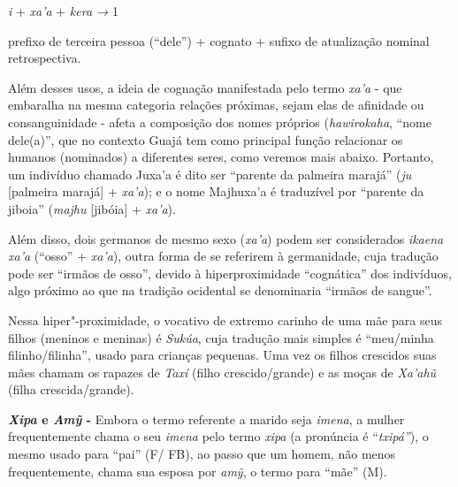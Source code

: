 \begin{center}
\emph{i} + \emph{xa'a} + \emph{kera} \emph{→} 1
\end{center}

\noindent prefixo de terceira pessoa (``dele'') + cognato + sufixo de atualização
nominal retrospectiva.

Além desses usos, a ideia de cognação manifestada pelo termo \emph{xa'a}
- que embaralha na mesma categoria relações próximas, sejam elas de
afinidade ou consanguinidade - afeta a composição dos nomes próprios
(\emph{hawirokaha}, ``nome dele(a)'', que no contexto Guajá tem como
principal função relacionar os humanos (nominados) a diferentes seres,
como veremos mais abaixo. Portanto, um indivíduo chamado Juxa'a é dito
ser ``parente da palmeira marajá'' (\emph{ju} {[}palmeira marajá{]} +
\emph{xa'a}); e o nome Majhuxa'a é traduzível por ``parente da jiboia''
(\emph{majhu} {[}jibóia{]} + \emph{xa'a}).

Além disso, dois germanos de mesmo sexo (\emph{xa'a}) podem ser
considerados \emph{ikaena} \emph{xa'a} (``osso'' + \emph{xa'a}), outra
forma de se referirem à germanidade, cuja tradução pode ser ``irmãos de
osso'', devido à hiperproximidade ``cognática'' dos indivíduos, algo
próximo ao que na tradição ocidental se denominaria ``irmãos de sangue''.

Nessa hiper"-proximidade, o vocativo de extremo carinho de uma mãe para
seus filhos (meninos e meninas) é \emph{Sukúa}, cuja tradução mais
simples é ``meu/minha filinho/filinha'', usado para crianças pequenas.
Uma vez os filhos crescidos suas mães chamam os rapazes de \emph{Taxí}
(filho crescido/grande) e as moças de \emph{Xa'ahũ} (filha
crescida/grande).

\textbf{\emph{Xipa} e \emph{Amỹ} -} Embora o termo referente a marido
seja \emph{imena}, a mulher frequentemente chama o seu \emph{imena} pelo
termo \emph{xipa} (a pronúncia é ``\emph{txipá''}), o mesmo usado para
``pai'' (F/ FB), ao passo que um homem, não menos frequentemente, chama
sua esposa por \emph{amỹ}, o termo para ``mãe'' (M).

